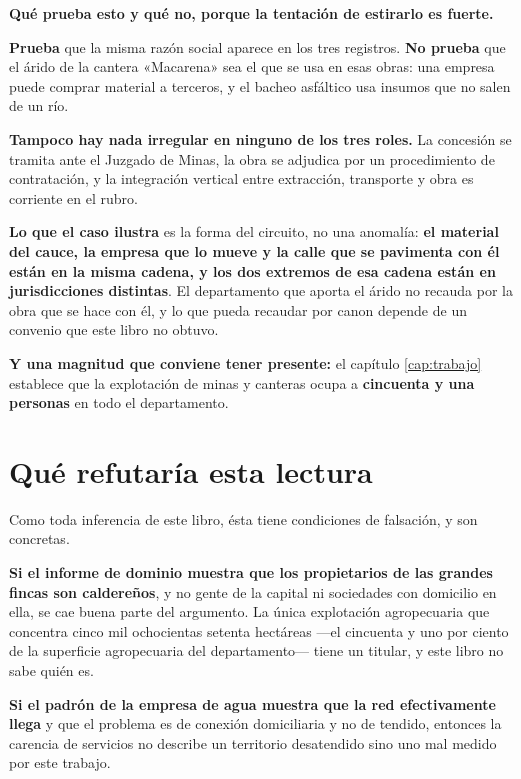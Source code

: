 \begin{cautela}
\textbf{Qué prueba esto y qué no, porque la tentación de estirarlo es fuerte.}

\textbf{Prueba} que la misma razón social aparece en los tres registros. \textbf{No prueba} que
el árido de la cantera «Macarena» sea el que se usa en esas obras: una empresa puede comprar
material a terceros, y el bacheo asfáltico usa insumos que no salen de un río.

\textbf{Tampoco hay nada irregular en ninguno de los tres roles.} La concesión se tramita ante
el Juzgado de Minas, la obra se adjudica por un procedimiento de contratación, y la
integración vertical entre extracción, transporte y obra es corriente en el rubro.

\textbf{Lo que el caso ilustra} es la forma del circuito, no una anomalía: \textbf{el material
del cauce, la empresa que lo mueve y la calle que se pavimenta con él están en la misma cadena,
y los dos extremos de esa cadena están en jurisdicciones distintas}. El departamento que aporta
el árido no recauda por la obra que se hace con él, y lo que pueda recaudar por canon depende de un convenio que este libro no obtuvo.

\textbf{Y una magnitud que conviene tener presente:} el capítulo \ref{cap:trabajo} establece que
la explotación de minas y canteras ocupa a \textbf{cincuenta y una personas} en todo el
departamento.
\end{cautela}

\section{Qué refutaría esta lectura}

Como toda inferencia de este libro, ésta tiene condiciones de falsación, y son concretas.

\textbf{Si el informe de dominio muestra que los propietarios de las grandes fincas son
caldereños}, y no gente de la capital ni sociedades con domicilio en ella, se cae buena parte
del argumento. La única explotación agropecuaria que concentra cinco mil ochocientas setenta
hectáreas —el cincuenta y uno por ciento de la superficie agropecuaria del departamento—
tiene un titular, y este libro no sabe quién es.

\textbf{Si el padrón de la empresa de agua muestra que la red efectivamente llega} y que el
problema es de conexión domiciliaria y no de tendido, entonces la carencia de servicios no
describe un territorio desatendido sino uno mal medido por este trabajo.

